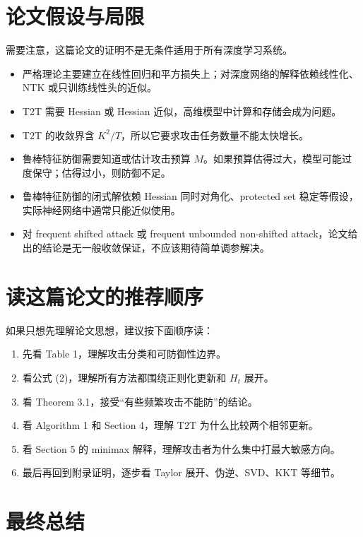 \documentclass[UTF8,fontset=none,11pt]{ctexart}
\begin{document}
\section{论文假设与局限}

需要注意，这篇论文的证明不是无条件适用于所有深度学习系统。

\begin{itemize}
  \item 严格理论主要建立在线性回归和平方损失上；对深度网络的解释依赖线性化、NTK 或只训练线性头的近似。
  \item T2T 需要 Hessian 或 Hessian 近似，高维模型中计算和存储会成为问题。
  \item T2T 的收敛界含 \(K^2/T\)，所以它要求攻击任务数量不能太快增长。
  \item 鲁棒特征防御需要知道或估计攻击预算 \(M\)。如果预算估得过大，模型可能过度保守；估得过小，则防御不足。
  \item 鲁棒特征防御的闭式解依赖 Hessian 同时对角化、protected set 稳定等假设，实际神经网络中通常只能近似使用。
  \item 对 frequent shifted attack 或 frequent unbounded non-shifted attack，论文给出的结论是无一般收敛保证，不应该期待简单调参解决。
\end{itemize}

\section{读这篇论文的推荐顺序}

如果只想先理解论文思想，建议按下面顺序读：
\begin{enumerate}
  \item 先看 Table 1，理解攻击分类和可防御性边界。
  \item 看公式 (2)，理解所有方法都围绕正则化更新和 \(H_t\) 展开。
  \item 看 Theorem 3.1，接受“有些频繁攻击不能防”的结论。
  \item 看 Algorithm 1 和 Section 4，理解 T2T 为什么比较两个相邻更新。
  \item 看 Section 5 的 minimax 解释，理解攻击者为什么集中打最大敏感方向。
  \item 最后再回到附录证明，逐步看 Taylor 展开、伪逆、SVD、KKT 等细节。
\end{enumerate}

\section{最终总结}
\end{document}
